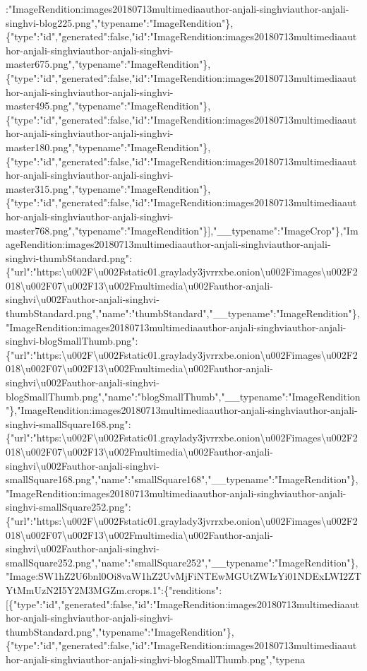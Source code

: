 :"ImageRendition:images20180713multimediaauthor-anjali-singhviauthor-anjali-singhvi-blog225.png","typename":"ImageRendition"\},\{"type":"id","generated":false,"id":"ImageRendition:images20180713multimediaauthor-anjali-singhviauthor-anjali-singhvi-master675.png","typename":"ImageRendition"\},\{"type":"id","generated":false,"id":"ImageRendition:images20180713multimediaauthor-anjali-singhviauthor-anjali-singhvi-master495.png","typename":"ImageRendition"\},\{"type":"id","generated":false,"id":"ImageRendition:images20180713multimediaauthor-anjali-singhviauthor-anjali-singhvi-master180.png","typename":"ImageRendition"\},\{"type":"id","generated":false,"id":"ImageRendition:images20180713multimediaauthor-anjali-singhviauthor-anjali-singhvi-master315.png","typename":"ImageRendition"\},\{"type":"id","generated":false,"id":"ImageRendition:images20180713multimediaauthor-anjali-singhviauthor-anjali-singhvi-master768.png","typename":"ImageRendition"\}{]},"\_\_typename":"ImageCrop"\},"ImageRendition:images20180713multimediaauthor-anjali-singhviauthor-anjali-singhvi-thumbStandard.png":\{"url":"https:\textbackslash{}u002F\textbackslash{}u002Fstatic01.graylady3jvrrxbe.onion\textbackslash{}u002Fimages\textbackslash{}u002F2018\textbackslash{}u002F07\textbackslash{}u002F13\textbackslash{}u002Fmultimedia\textbackslash{}u002Fauthor-anjali-singhvi\textbackslash{}u002Fauthor-anjali-singhvi-thumbStandard.png","name":"thumbStandard","\_\_typename":"ImageRendition"\},"ImageRendition:images20180713multimediaauthor-anjali-singhviauthor-anjali-singhvi-blogSmallThumb.png":\{"url":"https:\textbackslash{}u002F\textbackslash{}u002Fstatic01.graylady3jvrrxbe.onion\textbackslash{}u002Fimages\textbackslash{}u002F2018\textbackslash{}u002F07\textbackslash{}u002F13\textbackslash{}u002Fmultimedia\textbackslash{}u002Fauthor-anjali-singhvi\textbackslash{}u002Fauthor-anjali-singhvi-blogSmallThumb.png","name":"blogSmallThumb","\_\_typename":"ImageRendition"\},"ImageRendition:images20180713multimediaauthor-anjali-singhviauthor-anjali-singhvi-smallSquare168.png":\{"url":"https:\textbackslash{}u002F\textbackslash{}u002Fstatic01.graylady3jvrrxbe.onion\textbackslash{}u002Fimages\textbackslash{}u002F2018\textbackslash{}u002F07\textbackslash{}u002F13\textbackslash{}u002Fmultimedia\textbackslash{}u002Fauthor-anjali-singhvi\textbackslash{}u002Fauthor-anjali-singhvi-smallSquare168.png","name":"smallSquare168","\_\_typename":"ImageRendition"\},"ImageRendition:images20180713multimediaauthor-anjali-singhviauthor-anjali-singhvi-smallSquare252.png":\{"url":"https:\textbackslash{}u002F\textbackslash{}u002Fstatic01.graylady3jvrrxbe.onion\textbackslash{}u002Fimages\textbackslash{}u002F2018\textbackslash{}u002F07\textbackslash{}u002F13\textbackslash{}u002Fmultimedia\textbackslash{}u002Fauthor-anjali-singhvi\textbackslash{}u002Fauthor-anjali-singhvi-smallSquare252.png","name":"smallSquare252","\_\_typename":"ImageRendition"\},"Image:SW1hZ2U6bnl0Oi8vaW1hZ2UvMjFiNTEwMGUtZWIzYi01NDExLWI2ZTYtMmUzN2I5Y2M3MGZm.crops.1":\{"renditions":{[}\{"type":"id","generated":false,"id":"ImageRendition:images20180713multimediaauthor-anjali-singhviauthor-anjali-singhvi-thumbStandard.png","typename":"ImageRendition"\},\{"type":"id","generated":false,"id":"ImageRendition:images20180713multimediaauthor-anjali-singhviauthor-anjali-singhvi-blogSmallThumb.png","typena